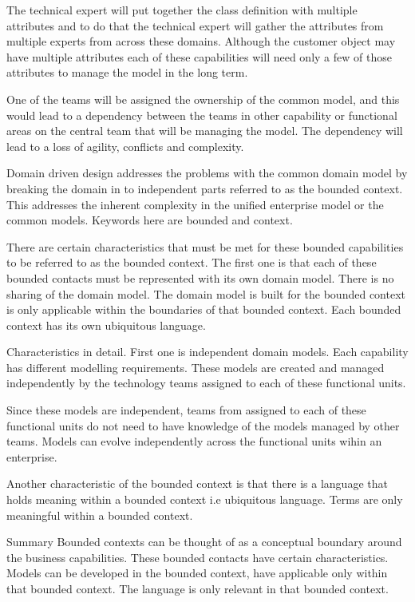 The technical expert will put together the class definition with multiple attributes and to do that the technical expert will gather the attributes from multiple experts from across these domains.
Although the customer object may have multiple attributes each of these capabilities will need only a few of those attributes to manage the model in the long term.

One of the teams will be assigned the ownership of the common model, and this would lead to a dependency between the teams in other capability or functional areas on the central team that will be managing the model.
The dependency will lead to a loss of agility, conflicts and complexity.

Domain driven design addresses the problems with the common domain model by breaking the domain in to independent parts referred to as the bounded context.
This addresses the inherent complexity in the unified enterprise model or the common models.
Keywords here are bounded and context.

There are certain characteristics that must be met for these bounded capabilities to be referred to as the bounded context.
The first one is that each of these bounded contacts must be represented with its own domain model.
There is no sharing of the domain model.
The domain model is built for the bounded context is only applicable within the boundaries of that bounded context.
Each bounded context has its own ubiquitous language.

Characteristics in detail.
First one is independent domain models.
Each capability has different modelling requirements.
These models are created and managed independently by the technology teams assigned to each of these functional units.

Since these models are independent, teams from assigned to each of these functional units do not need to have knowledge of the models managed by other teams.
Models can evolve independently across the functional units wihin an enterprise.

Another characteristic of the bounded context is that there is a language that holds meaning within a bounded context i.e ubiquitous language.
Terms are only meaningful within a bounded context.

Summary
Bounded contexts can be thought of as a conceptual boundary around the business capabilities.
These bounded contacts have certain characteristics.
Models can be developed in the bounded context, have applicable only within that bounded context.
The language is only relevant in that bounded context.

